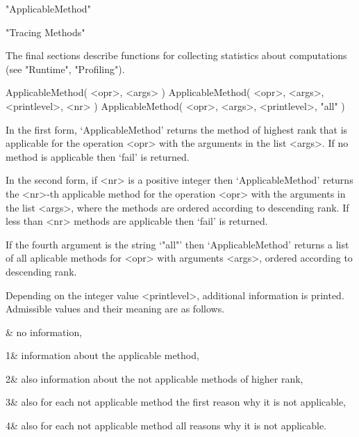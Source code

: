 

"ApplicableMethod"

"Tracing Methods"

The final sections describe functions for collecting statistics about
computations (see "Runtime", "Profiling").



\>ApplicableMethod( <opr>, <args> )
\>ApplicableMethod( <opr>, <args>, <printlevel>, <nr> )
\>ApplicableMethod( <opr>, <args>, <printlevel>, "all" )

In the first form, `ApplicableMethod' returns the method of highest rank
that is applicable for the operation <opr> with the arguments in the list
<args>.
If no method is applicable then `fail' is returned.

In the second form, if <nr> is a positive integer then `ApplicableMethod'
returns the <nr>-th applicable method for the operation <opr> with the
arguments in the list <args>,
where the methods are ordered according to descending rank.
If less than <nr> methods are applicable then `fail' is returned.

If the fourth argument is the string `"all"' then `ApplicableMethod'
returns a list of all aplicable methods for <opr> with arguments <args>,
ordered according to descending rank.

Depending on the integer value <printlevel>,
additional information is printed.
Admissible values and their meaning are as follows.

& no information,

1& information about the applicable method,

2& also information about the not applicable methods of higher rank,

3& also for each not applicable method the first reason why it is not
   applicable,

4& also for each not applicable method all reasons why it is not
   applicable.
\enditems


